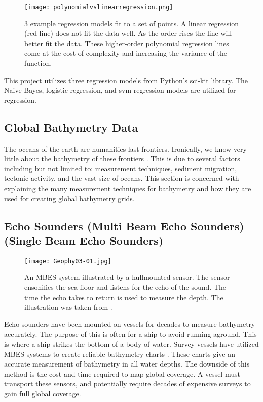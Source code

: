 \begin{figure}[htp]
    \centering
    \texttt{[image: polynomialvslinearregression.png]}
    \caption{3 example regression models fit to a set of points.
    A linear regression (red line) does not fit the data well.
    As the order rises the line will better fit the data.
    These higher-order polynomial regression lines come at the cost of complexity and increasing the variance of the function.}
    \label{fig:repressionexample}
\end{figure} 

\medskip


This project utilizes three regression models from Python's sci-kit library.
The Naive Bayes\cite{sklearn_api}, logistic regression\cite{sklearn_api}, and svm regression\cite{sklearn_api} models are utilized for regression.

\subsection{Global Bathymetry Data}
The oceans of the earth are humanities last frontiers.
Ironically, we know very little about the bathymetry of these frontiers \cite{becker2009global}.
This is due to several factors including but not limited to: measurement techniques, sediment migration, tectonic activity, and the vast size of oceans.
This section is concerned with explaining the many measurement techniques for bathymetry and how they are used for creating global bathymetry grids.

\subsection{Echo Sounders (Multi Beam Echo Sounders)(Single Beam Echo Sounders) }

\begin{figure}[htp]
    \centering
    \texttt{[image: Geophy03-01.jpg]}
    \caption{An \ac{MBES} system illustrated by a hull\-mounted sensor.
    The sensor ensonifies the sea floor and listens for the echo of the sound.
    The time the echo takes to return is used to measure the depth. 
    The illustration was taken from \cite{monacoWeb}.}
    \label{fig:MBES}
\end{figure}

Echo sounders have been mounted on vessels for decades to measure bathymetry accurately.
The purpose of this is often for a ship to avoid running aground.
This is where a ship strikes the bottom of a body of water.
Survey vessels have utilized \ac{MBES} systems to create reliable bathymetry charts \cite{farr1980multibeam}.
These charts give an accurate measurement of bathymetry in all water depths.
The downside of this method is the cost and time required to map global coverage.
A vessel must transport these sensors, and potentially require decades of expensive surveys to gain full global coverage.

